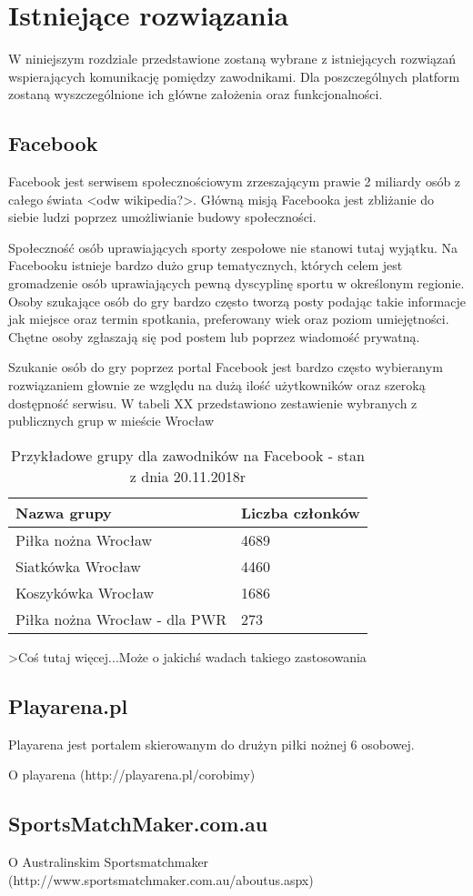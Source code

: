 \chapter{Istniejące rozwiązania}

W niniejszym rozdziale przedstawione zostaną wybrane z istniejących rozwiązań wspierających komunikację pomiędzy zawodnikami. Dla poszczególnych platform zostaną wyszczególnione ich główne założenia oraz funkcjonalności.


\section{Facebook}

Facebook jest serwisem społecznościowym zrzeszającym prawie 2 miliardy osób z całego świata <odw wikipedia?>. Główną misją Facebooka jest zbliżanie do siebie ludzi poprzez umożliwianie budowy społeczności.

Społeczność osób uprawiających sporty zespołowe nie stanowi tutaj wyjątku. Na Facebooku istnieje bardzo dużo grup tematycznych, których celem jest gromadzenie osób uprawiających pewną dyscyplinę sportu w określonym regionie. Osoby szukające osób do gry bardzo często tworzą posty podając takie informacje jak miejsce oraz termin spotkania, preferowany wiek oraz poziom umiejętności. Chętne osoby zgłaszają się pod postem lub poprzez wiadomość prywatną. 

Szukanie osób do gry poprzez portal Facebook jest bardzo często wybieranym rozwiązaniem głownie ze względu na dużą ilość użytkowników oraz szeroką dostępność serwisu. W tabeli XX przedstawiono zestawienie wybranych z publicznych grup w mieście Wrocław


\begin{table}[htb]
\centering\small
\caption{Przykładowe grupy dla zawodników na Facebook - stan z dnia 20.11.2018r}
\label{tab:szablon}
\begin{tabularx}{\linewidth}{|p{.55\linewidth}|X|}\hline
Nazwa grupy & Liczba członków \\ \hline\hline
Piłka nożna Wrocław & 4689  \\ \hline
Siatkówka Wrocław & 4460  \\ \hline
Koszykówka Wrocław & 1686 \\ \hline
Piłka nożna Wrocław - dla PWR & 273  \\ \hline
\end{tabularx}
\end{table}

>Coś tutaj więcej...Może o jakichś wadach takiego zastosowania

\section{Playarena.pl}

Playarena jest portalem skierowanym do drużyn piłki nożnej 6 osobowej. 

O playarena (http://playarena.pl/corobimy)

\section{SportsMatchMaker.com.au}

O Australinskim Sportsmatchmaker (http://www.sportsmatchmaker.com.au/aboutus.aspx)

